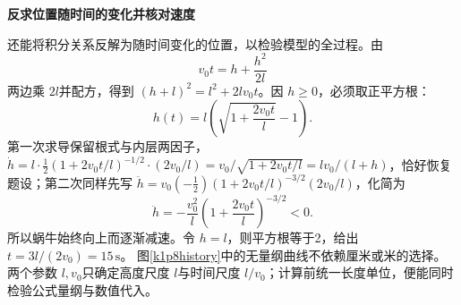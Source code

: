 \begin{solution}
\par\medskip{}\noindent\textbf{反求位置随时间的变化并核对速度}\par\nobreak
还能将积分关系反解为随时间变化的位置，以检验模型的全过程。由
\[v_0t=h+\frac{h^2}{2l}\]
两边乘 $2l$并配方，得到 $(h+l)^2=l^2+2lv_0t$。因 $h\ge0$，必须取正平方根：
\[h(t)=l\left(\sqrt{1+\frac{2v_0t}{l}}-1\right).\]
第一次求导保留根式与内层两因子，$\dot h=l\cdot\tfrac12(1+2v_0t/l)^{-1/2}\cdot(2v_0/l)=v_0/\sqrt{1+2v_0t/l}=lv_0/(l+h)$，恰好恢复题设；第二次同样先写 $\ddot h=v_0(-\tfrac12)(1+2v_0t/l)^{-3/2}(2v_0/l)$，化简为
\[\ddot h=-\frac{v_0^2}{l}
 \left(1+\frac{2v_0t}{l}\right)^{-3/2}<0.\]
所以蜗牛始终向上而逐渐减速。令 $h=l$，则平方根等于2，给出 $t=3l/(2v_0)=15\,\mathrm s$。
图\ref{k1p8history}中的无量纲曲线不依赖厘米或米的选择。两个参数 $l,v_0$只确定高度尺度 $l$与时间尺度 $l/v_0$；计算前统一长度单位，便能同时检验公式量纲与数值代入。
\end{solution}
